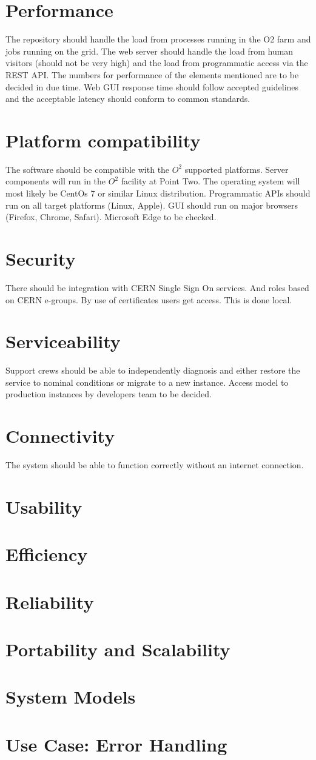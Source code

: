 \section{Performance}
The repository should handle the load from processes running in the O2 farm and jobs running on the grid. The web server should handle the load from human visitors (should not be very high) and the load from programmatic access via the REST API. The numbers for performance of the elements mentioned are to be decided in due time. Web GUI response time should follow accepted guidelines and the acceptable latency should conform to common standards.

\section{Platform compatibility}
The software should be compatible with the $O^2$ supported platforms. Server components will run in the $O^2$ facility at Point Two. The operating system will most likely be CentOs 7 or similar Linux distribution. Programmatic APIs should run on all target platforms (Linux, Apple). GUI should run on major browsers (Firefox, Chrome, Safari). Microsoft Edge to be checked.

\section{Security}
There should be integration with CERN Single Sign On services. And roles based on CERN e-groups. By use of certificates users get access. This is done local.

\section{Serviceability}
Support crews should be able to independently diagnosis and either restore the service to nominal conditions or migrate to a new instance. Access model to production instances by developers team to be decided.

\section{Connectivity}
The system should be able to function correctly without an internet connection.

\section{Usability}

\section{Efficiency}
\section{Reliability}
\section{Portability and Scalability}
\section{System Models}
\section{Use Case: Error Handling}

